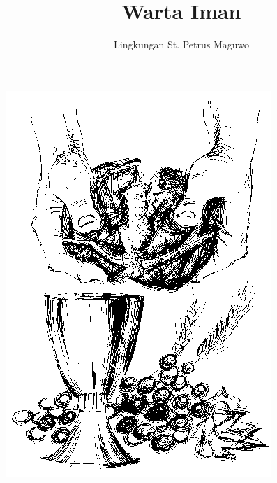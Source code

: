 \documentclass[a5paper,titlepage,10pt,openany]{scrbook}
\author{Lingkungan St. Petrus Maguwo}
\title{Warta Iman}
\begin{document}
\thispagestyle{empty}

\setlength{\parindent}{1cm}
\pagestyle{plain}


%


\begin{center}
\includegraphics[scale=0.35]{gambar/Cat-1011.png}
\end{center}





\end{document}
